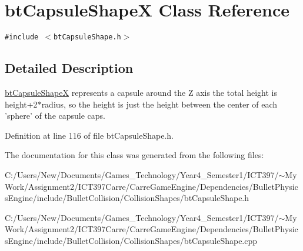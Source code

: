 \hypertarget{classbt_capsule_shape_x}{
\section{btCapsuleShapeX Class Reference}
\label{classbt_capsule_shape_x}
}
{\tt \#include $<$btCapsuleShape.h$>$}



\subsection{Detailed Description}
\hyperlink{classbt_capsule_shape_x}{btCapsuleShapeX} represents a capsule around the Z axis the total height is height+2$\ast$radius, so the height is just the height between the center of each 'sphere' of the capsule caps. 

Definition at line 116 of file btCapsuleShape.h.

The documentation for this class was generated from the following files:\begin{CompactItemize}
\item 
C:/Users/New/Documents/Games\_\-Technology/Year4\_\-Semester1/ICT397/$\sim$My Work/Assignment2/ICT397Carre/CarreGameEngine/Dependencies/BulletPhysicsEngine/include/BulletCollision/CollisionShapes/btCapsuleShape.h\item 
C:/Users/New/Documents/Games\_\-Technology/Year4\_\-Semester1/ICT397/$\sim$My Work/Assignment2/ICT397Carre/CarreGameEngine/Dependencies/BulletPhysicsEngine/include/BulletCollision/CollisionShapes/btCapsuleShape.cpp\end{CompactItemize}

